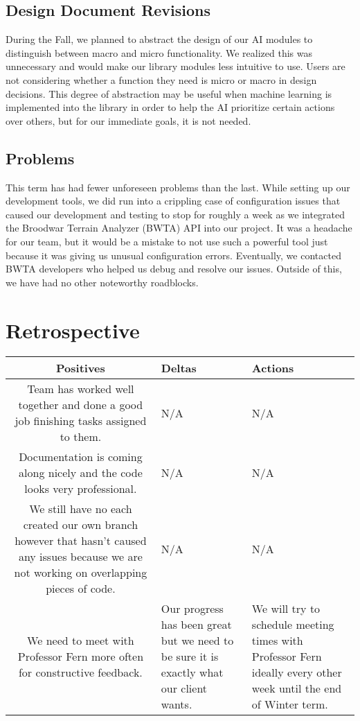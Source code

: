 \documentclass[10pt,letterpaper,onecolumn,draftclsnofoot]{IEEEtran}
\begin{document}
	\subsection{Design Document Revisions}
	During the Fall, we planned to abstract the design of our AI modules to distinguish between macro and micro functionality. We realized this was unnecessary and would make our library modules less intuitive to use. Users are not considering whether a function they need is micro or macro in design decisions. This degree of abstraction may be useful when machine learning is implemented into the library in order to help the AI prioritize certain actions over others, but for our immediate goals, it is not needed.
	
	\subsection{Problems}
	This term has had fewer unforeseen problems than the last. While setting up our development tools, we did run into a crippling case of configuration issues that caused our development and testing to stop for roughly a week as we integrated the Broodwar Terrain Analyzer (BWTA) API into our project. It was a headache for our team, but it would be a mistake to not use such a powerful tool just because it was giving us unusual configuration errors. Eventually, we contacted BWTA developers who helped us debug and resolve our issues. Outside of this, we have had no other noteworthy roadblocks. 
	
	\section{Retrospective}
	\begin{center}
		\begin{tabular}{ |C|L|L| } 
			\hline
			Positives & Deltas & Actions \\
			\hline
			Team has worked well together and done a good job finishing tasks assigned to them. & N/A & N/A \\ 
			\hline
			Documentation is coming along nicely and the code looks very professional. & N/A & N/A \\ 
			\hline
			We still have no each created our own branch however that hasn't caused any issues because we are not working on overlapping pieces of code. & N/A & N/A \\ 
			\hline
			We need to meet with Professor Fern more often for constructive feedback. & Our progress has been great but we need to be sure it is exactly what our client wants. & We will try to schedule meeting times with Professor Fern ideally every other week until the end of Winter term. \\
			\hline

		\end{tabular}
	\end{center}
	\clearpage
\end{document}
